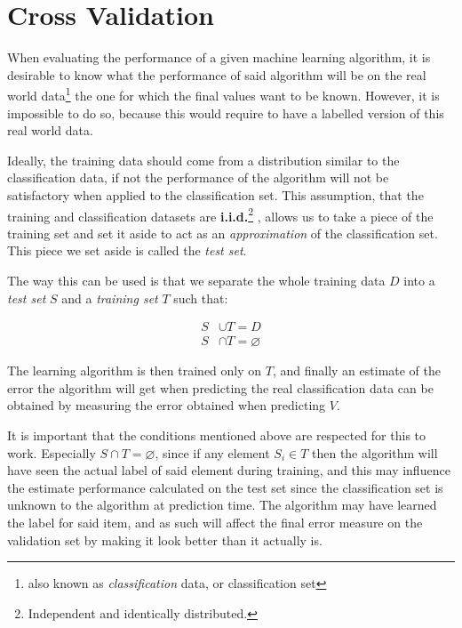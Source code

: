 \documentclass[epsfig,a4paper,11pt,titlepage,twoside,openany]{book}
\begin{document}
\section{Cross Validation}
\label{sec:cross-validation}

When evaluating the performance of a given machine learning algorithm, it is desirable to know what the performance of said algorithm will be on the real world data\footnote{also known as \textit{classification} data, or classification set} the one for which the final values want to be known. However, it is impossible to do so, because this would require to have a labelled version of this real world data. 

Ideally, the training data should come from a distribution similar to the classification data, if not the performance of the algorithm will not be satisfactory when applied to the classification set. This assumption, that the training and classification datasets are \textbf{i.i.d.}\footnote{Independent and identically distributed.} \cite{clauset2011brief}, allows us to take a piece of the training set and set it aside to act as an \textit{approximation} of the classification set. This piece we set aside is called the \textit{test set}. 

The way this can be used is that we separate the whole training data $D$ into a \textit{test set} $S$ and a \textit{training set} $T$ such that:

\begin{align*}
    S &\cup T = D \\ 
    S &\cap T = \varnothing
\end{align*}

The learning algorithm is then trained only on $T$, and finally an estimate of the error the algorithm will get when predicting the real classification data can be obtained by measuring the error obtained when predicting $V$. 

It is important that the conditions mentioned above are respected for this to work. Especially $S \cap T = \varnothing$, since if any element $S_i \in T$ then the algorithm will have seen the actual label of said element during training, and this may influence the estimate performance calculated on the test set since the classification set is unknown to the algorithm at prediction time. The algorithm may have learned the label for said item, and as such will affect the final error measure on the validation set by making it look better than it actually is.
\end{document}
